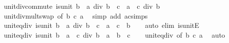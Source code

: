 \begin{isabellebody}
\endisatagproof
{\isafoldproof}%
%
\isadelimproof
\isanewline
%
\endisadelimproof
\isanewline
{}\isamarkupfalse%
\ unit{\isacharunderscore}{\kern0pt}div{\isacharunderscore}{\kern0pt}commute{\isacharcolon}{\kern0pt}\ {\isachardoublequoteopen}is{\isacharunderscore}{\kern0pt}unit\ b\ {\isasymLongrightarrow}\ {\isacharparenleft}{\kern0pt}a\ div\ b{\isacharparenright}{\kern0pt}\ {\isacharasterisk}{\kern0pt}\ c\ {\isacharequal}{\kern0pt}\ {\isacharparenleft}{\kern0pt}a\ {\isacharasterisk}{\kern0pt}\ c{\isacharparenright}{\kern0pt}\ div\ b{\isachardoublequoteclose}\isanewline
%
\isadelimproof
\ \ %
\endisadelimproof
%
\isatagproof
{}\isamarkupfalse%
\ unit{\isacharunderscore}{\kern0pt}div{\isacharunderscore}{\kern0pt}mult{\isacharunderscore}{\kern0pt}swap\ {\isacharbrackleft}{\kern0pt}of\ b\ c\ a{\isacharbrackright}{\kern0pt}\ \isamarkupfalse%
\ {\isacharparenleft}{\kern0pt}simp\ add{\isacharcolon}{\kern0pt}\ ac{\isacharunderscore}{\kern0pt}simps{\isacharparenright}{\kern0pt}%
\endisatagproof
{\isafoldproof}%
%
\isadelimproof
\isanewline
%
\endisadelimproof
\isanewline
{}\isamarkupfalse%
\ unit{\isacharunderscore}{\kern0pt}eq{\isacharunderscore}{\kern0pt}div{}{\isacharcolon}{\kern0pt}\ {\isachardoublequoteopen}is{\isacharunderscore}{\kern0pt}unit\ b\ {\isasymLongrightarrow}\ a\ div\ b\ {\isacharequal}{\kern0pt}\ c\ {\isasymlongleftrightarrow}\ a\ {\isacharequal}{\kern0pt}\ c\ {\isacharasterisk}{\kern0pt}\ b{\isachardoublequoteclose}\isanewline
%
\isadelimproof
\ \ %
\endisadelimproof
%
\isatagproof
{}\isamarkupfalse%
\ {\isacharparenleft}{\kern0pt}auto\ elim{\isacharcolon}{\kern0pt}\ is{\isacharunderscore}{\kern0pt}unitE{\isacharparenright}{\kern0pt}%
\endisatagproof
{\isafoldproof}%
%
\isadelimproof
\isanewline
%
\endisadelimproof
\isanewline
{}\isamarkupfalse%
\ unit{\isacharunderscore}{\kern0pt}eq{\isacharunderscore}{\kern0pt}div{}{\isacharcolon}{\kern0pt}\ {\isachardoublequoteopen}is{\isacharunderscore}{\kern0pt}unit\ b\ {\isasymLongrightarrow}\ a\ {\isacharequal}{\kern0pt}\ c\ div\ b\ {\isasymlongleftrightarrow}\ a\ {\isacharasterisk}{\kern0pt}\ b\ {\isacharequal}{\kern0pt}\ c{\isachardoublequoteclose}\isanewline
%
\isadelimproof
\ \ %
\endisadelimproof
%
\isatagproof
{}\isamarkupfalse%
\ unit{\isacharunderscore}{\kern0pt}eq{\isacharunderscore}{\kern0pt}div{}\ {\isacharbrackleft}{\kern0pt}of\ b\ c\ a{\isacharbrackright}{\kern0pt}\ \isamarkupfalse%
\ auto%
\endisatagproof
{\isafoldproof}%
%
\isadelimproof

\end{isabellebody}
